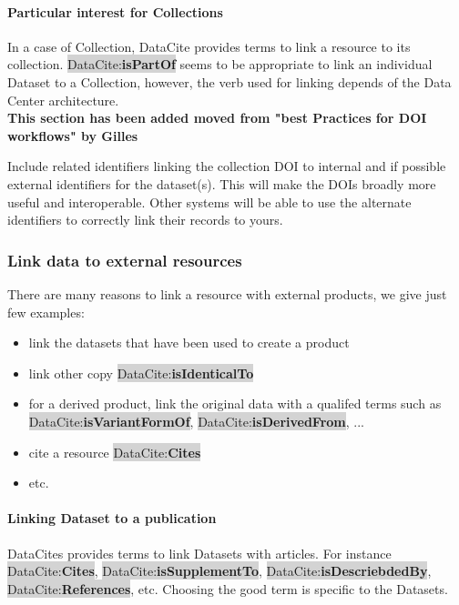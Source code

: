 \documentclass[11pt,a4paper]{ivoa}
\newcommand{\dataciteterm}[1]{\colorbox{lightgray}{DataCite:\textbf{#1}}}
\begin{document}
\paragraph{Particular interest for Collections}
In a case of Collection, DataCite provides terms to link a resource  to its collection. 
\dataciteterm{isPartOf}  seems to be appropriate to link an individual Dataset to a Collection, however, the verb used for linking depends of the Data Center architecture. \\

\textbf{\color{red}This section has been added moved from "best Practices for DOI workflows"  by Gilles }


Include related identifiers linking the collection DOI to internal and if possible external identifiers for the dataset(s). 
This will make the DOIs broadly more useful and interoperable.
Other systems will be able to use the alternate identifiers to correctly link their records to yours.


\subsubsection{Link data to external resources}
There are many reasons to link a resource with external products, we give just few examples:

\begin{itemize}
	\item link the datasets that have been used to create a product 
	\item link other copy \dataciteterm{isIdenticalTo}
	\item for a derived product, link the original data with a qualifed terms such as \dataciteterm{isVariantFormOf}, \dataciteterm{isDerivedFrom}, ...
	\item cite a resource \dataciteterm{Cites}
	\item etc.
\end{itemize}



\paragraph{Linking Dataset to a publication}
DataCites provides terms to link Datasets with articles. For instance \dataciteterm{Cites}, \dataciteterm{isSupplementTo}, \dataciteterm{isDescriebdedBy}, \dataciteterm{References}, etc.
Choosing the good term is specific to the Datasets. \\
\end{document}
